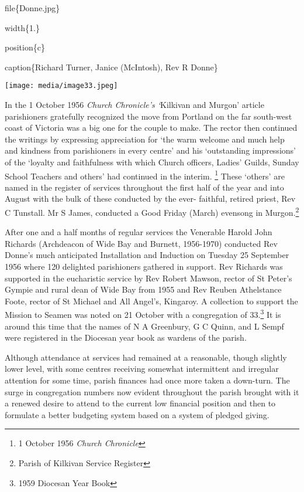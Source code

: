file\{Donne.jpg\}

width\{1.\}

position\{c\}

caption\{Richard Turner, Janice (McIntosh), Rev R Donne\}

\texttt{[image: media/image33.jpeg]}

In the 1 October 1956 \emph{Church Chronicle's `}Kilkivan and Murgon' article parishioners gratefully recognized the move from Portland on the far south-west coast of Victoria was a big one for the couple to make. The rector then continued the writings by expressing appreciation for `the warm welcome and much help and kindness from parishioners in every centre' and his `outstanding impressions' of the `loyalty and faithfulness with which Church officers, Ladies' Guilds, Sunday School Teachers and others' had continued in the interim. \footnote{1 October 1956 \emph{Church Chronicle}} These `others' are named in the register of services throughout the first half of the year and into August with the bulk of these conducted by the ever- faithful, retired priest, Rev C Tunstall. Mr S James, conducted a Good Friday (March) evensong in Murgon.\footnote{Parish of Kilkivan Service Register}

After one and a half months of regular services the Venerable Harold John Richards (Archdeacon of Wide Bay and Burnett, 1956-1970) conducted Rev Donne's much anticipated Installation and Induction on Tuesday 25 September 1956 where 120 delighted parishioners gathered in support. Rev Richards was supported in the eucharistic service by Rev Robert Mawson, rector of St Peter's Gympie and rural dean of Wide Bay from 1955 and Rev Reuben Athelstance Foote, rector of St Michael and All Angel's, Kingaroy. A collection to support the Mission to Seamen was noted on 21 October with a congregation of 33.\footnote{1959 Diocesan Year Book} It is around this time that the names of N A Greenbury, G C Quinn, and L Sempf were registered in the Diocesan year book as wardens of the parish.

Although attendance at services had remained at a reasonable, though slightly lower level, with some centres receiving somewhat intermittent and irregular attention for some time, parish finances had once more taken a down-turn. The surge in congregation numbers now evident throughout the parish brought with it a renewed desire to attend to the current low financial position and then to formulate a better budgeting system based on a system of pledged giving.

